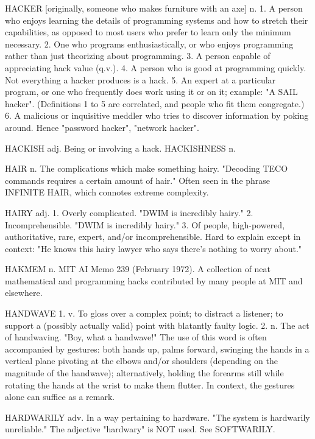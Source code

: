 HACKER [originally, someone who makes furniture with an axe] n. 1. A
   person who enjoys learning the details of programming systems and
   how to stretch their capabilities, as opposed to most users who
   prefer to learn only the minimum necessary.	2. One who programs
   enthusiastically, or who enjoys programming rather than just
   theorizing about programming.  3. A person capable of appreciating
   hack value (q.v.).  4. A person who is good at programming quickly.
   Not everything a hacker produces is a hack.	5. An expert at a
   particular program, or one who frequently does work using it or on
   it; example: "A SAIL hacker".  (Definitions 1 to 5 are correlated,
   and people who fit them congregate.)	 6. A malicious or inquisitive
   meddler who tries to discover information by poking around.	Hence
   "password hacker", "network hacker".

HACKISH adj. Being or involving a hack.	 HACKISHNESS n.

HAIR n. The complications which make something hairy.  "Decoding TECO
   commands requires a certain amount of hair."	 Often seen in the
   phrase INFINITE HAIR, which connotes extreme complexity.

HAIRY adj. 1. Overly complicated.  "DWIM is incredibly hairy."	2.
   Incomprehensible.  "DWIM is incredibly hairy."  3.  Of people,
   high-powered, authoritative, rare, expert, and/or incomprehensible.
   Hard to explain except in context: "He knows this hairy lawyer who
   says there's nothing to worry about."

HAKMEM n. MIT AI Memo 239 (February 1972).  A collection of neat
   mathematical and programming hacks contributed by many people
   at MIT and elsewhere.

HANDWAVE 1. v. To gloss over a complex point; to distract a listener;
   to support a (possibly actually valid) point with blatantly faulty
   logic.  2. n. The act of handwaving.	 "Boy, what a handwave!"  The
   use of this word is often accompanied by gestures: both hands up,
   palms forward, swinging the hands in a vertical plane pivoting at
   the elbows and/or shoulders (depending on the magnitude of the
   handwave); alternatively, holding the forearms still while rotating
   the hands at the wrist to make them flutter.	 In context, the
   gestures alone can suffice as a remark.

HARDWARILY adv. In a way pertaining to hardware.  "The system is
   hardwarily unreliable."  The adjective "hardwary" is NOT used.  See
   SOFTWARILY.

